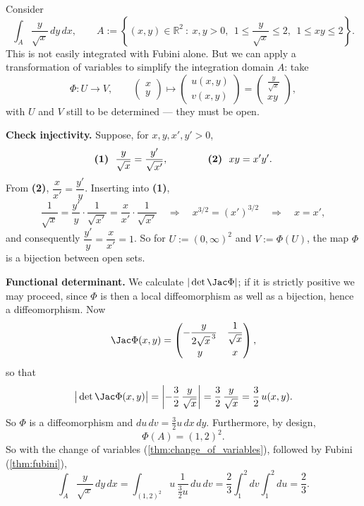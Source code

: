 \begin{example}
\label{ex:change_of_variables_domain}
Consider
\[\int_A \frac{y}{\sqrt{x}}\,dy\,dx, \qquad
A := \left\{(x,y) \in \mathbb{R}^2 \ :\ x,y>0,\ \ 1 \leq \frac{y}{\sqrt x} \leq 2,\ \ 1 \leq xy \leq 2\right\}.\]
This is not easily integrated with Fubini alone. But we can apply a transformation of variables
to simplify the integration domain $A$: take
\[\Phi : U \to V, \qquad \begin{pmatrix}x\\y\end{pmatrix} \mapsto
  \begin{pmatrix}u(x,y)\\v(x,y)\end{pmatrix} = \begin{pmatrix}\tfrac{y}{\sqrt x}\\[2pt] xy\end{pmatrix},\]
with $U$ and $V$ still to be determined --- they must be open.

\textbf{Check injectivity.} Suppose, for $x,y,x',y' > 0$,
\[\text{\textbf{(1)}}\ \ \frac{y}{\sqrt x} = \frac{y'}{\sqrt{x'}},
\qquad\qquad \text{\textbf{(2)}}\ \ xy = x'y'.\]
From \textbf{(2)}, $\dfrac{x}{x'} = \dfrac{y'}{y}$. Inserting into \textbf{(1)},
\[\frac{1}{\sqrt x} = \frac{y'}{y}\cdot\frac{1}{\sqrt{x'}} = \frac{x}{x'}\cdot\frac{1}{\sqrt{x'}}
\quad\Longrightarrow\quad x^{3/2} = (x')^{3/2} \quad\Longrightarrow\quad x = x',\]
and consequently $\dfrac{y'}{y} = \dfrac{x}{x'} = 1$. So for $U := (0,\infty)^2$ and
$V := \Phi(U)$, the map $\Phi$ is a bijection between open sets.

\textbf{Functional determinant.} We calculate $|\det \Jac\Phi|$; if it is strictly positive we
may proceed, since $\Phi$ is then a local diffeomorphism as well as a bijection, hence a
diffeomorphism. Now
\[\Jac\Phi(x,y) = \begin{pmatrix} -\dfrac{y}{2\sqrt{x}^{\,3}} & \dfrac{1}{\sqrt x} \\[2ex] y & x \end{pmatrix},\]
so that
\[\big|\det \Jac\Phi(x,y)\big| = \left|-\frac32\,\frac{y}{\sqrt x}\right| = \frac32\,\frac{y}{\sqrt x} = \frac32\,u(x,y).\]
So $\Phi$ is a diffeomorphism and $du\,dv = \tfrac32 u\,dx\,dy$. Furthermore, by design,
\[\Phi(A) = (1,2)^2.\]
So with the change of variables (\cref{thm:change_of_variables}), followed by Fubini
(\cref{thm:fubini}),
\[\int_A \frac{y}{\sqrt x}\,dy\,dx
  = \int_{(1,2)^2} u\,\frac{1}{\tfrac32 u}\,du\,dv
  = \frac23\int_1^2 dv \int_1^2 du
  = \frac23.\]
\end{example}

